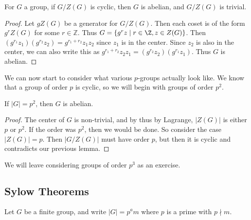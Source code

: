 \begin{lemma}
	For $G$ a group, if $G/Z(G)$ is cyclic, then $G$ is abelian, and $G/Z(G)$ is trivial.
\end{lemma}
\begin{proof}
	Let $gZ(G)$ be a generator for $G/Z(G)$. Then each coset is of the form $g^r Z(G)$ for some $r \in \mathbb{Z}$. Thus $G = \{g^r z \mid r \in \Z, z \in Z(G) \}$.
	Then $(g^{r_1} z_1)(g^{r_2}z_2) = g^{r_1 + r_2} z_1 z_2$ since $z_1$ is in the center.
	Since $z_2$ is also in the center, we can also write this as $g^{r_1 + r_2}z_2 z_1 =  (g^{r_2} z_2)(g^{r_1} z_1)$. Thus $G$ is abelian.
\end{proof}

We can now start to consider what various $p$-groups actually look like. We know that a group of order $p$ is cyclic, so we will begin with groups of order $p^2$.

\begin{corollary}
	If $|G| = p^2$, then $G$ is abelian.
\end{corollary}
\begin{proof}
	The center of $G$ is non-trivial, and by thus by Lagrange, $|Z(G)|$ is either $p$ or $p^2$. If the order was $p^2$, then we would be done. So consider the case $|Z(G)| = p$. Then $|G/Z(G)|$ must have order $p$, but then it is cyclic and contradicts our previous lemma.
\end{proof}

We will leave considering groups of order $p^3$ as an exercise.

\subsection{Sylow Theorems}

Let $G$ be a finite group, and write $|G| = p^a m$ where $p$ is a prime with $p \nmid m$.

